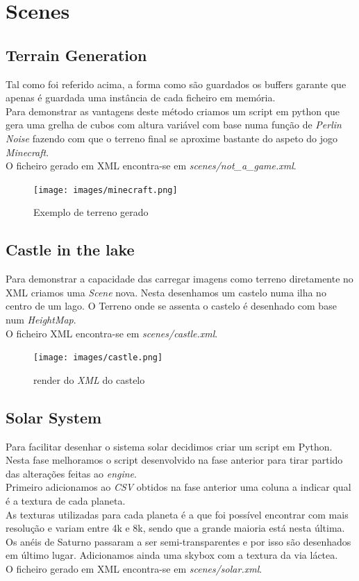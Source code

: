 \documentclass[a4paper]{report}
\begin{document}
\chapter{Scenes}
\section{Terrain Generation}
Tal como foi referido acima, a forma como são guardados os buffers garante que
apenas é guardada uma instância de cada ficheiro em memória. \\
Para demonstrar as vantagens deste método criamos um script em python que gera
uma grelha de cubos com altura variável com base numa função de \textit{Perlin
Noise} fazendo com que o terreno final se aproxime bastante do aspeto do jogo
\textit{Minecraft}.\\
O ficheiro gerado em XML encontra-se em \textit{scenes/not\_a\_game.xml}.

\begin{figure}[H]
    \centering 
    \texttt{[image: images/minecraft.png]}  
    \caption{Exemplo de terreno gerado}
\end{figure}

\section{Castle in the lake}
Para demonstrar a capacidade das carregar imagens como terreno diretamente no
XML criamos uma \textit{Scene} nova. Nesta desenhamos um castelo numa ilha no
centro de um lago. O Terreno onde se assenta o castelo é desenhado com base num
\textit{HeightMap}.\\
O ficheiro XML encontra-se em \textit{scenes/castle.xml}.

\begin{figure}[H]
    \centering 
    \texttt{[image: images/castle.png]}  
    \caption{render do \textit{XML} do castelo}
\end{figure}

\section{Solar System}
Para facilitar desenhar o sistema solar decidimos criar um script em Python.\\
Nesta fase melhoramos o script desenvolvido na fase anterior para tirar partido
das alterações feitas ao \textit{engine}.\\
Primeiro adicionamos ao \textit{CSV} obtidos na fase anterior  uma coluna a
indicar qual é a textura de cada planeta.\\
As texturas utilizadas para cada planeta é a que foi possível encontrar com mais
resolução e variam entre 4k e 8k, sendo que a grande maioria está nesta
última.\\
Os anéis de Saturno passaram a ser semi-transparentes e por isso são desenhados
em último lugar.
Adicionamos ainda uma skybox com a textura da via láctea.\\
O ficheiro gerado em XML encontra-se em \textit{scenes/solar.xml}.
\end{document}
